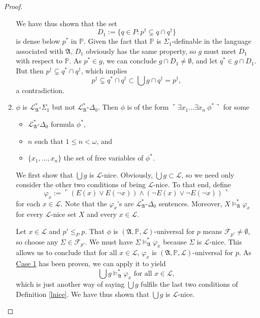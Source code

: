 \documentclass[12pt, twoside]{memoir}
\numberwithin{equation}{section}
\theoremstyle{definition}
\theoremstyle{remark}
\theoremstyle{definition}
\theoremstyle{definition}
\theoremstyle{definition}
\theoremstyle{remark}
\begin{document}
\begin{proof}
\begin{enumerate}[label=Case \arabic*:, leftmargin=50pt]
    We have thus shown that the set $$D_1 := \{q \in P : p^{\dagger} \subsetneq q \cap q^{\dagger}\}$$ is dense below $p^*$ in $\mathbb{P}$. Given the fact that $\mathbb{P}$ is $\Sigma_1$-definable in the language associated with $\mathfrak{A}$, $D_1$ obviously has the same property, so $g$ must meet $D_1$ with respect to $\mathbb{P}$. As $p^* \in g$, we can conclude $g \cap D_1 \neq \emptyset$, and let $q^* \in g \cap D_1$. But then $p^{\dagger} \subsetneq q^* \cap q^{\dagger}$, which implies $$p^{\dagger} \subsetneq q^* \cap q^{\dagger} \subset \bigcup g \cap q^{\dagger} = p^{\dagger},$$ a contradiction. 
    
    \item $\phi$ is $\mathcal{L}^{*}_{\mathfrak{A}}$-$\Sigma_1$ but not $\mathcal{L}^{*}_{\mathfrak{A}}$-$\Delta_0$. Then $\phi$ is of the form $\ulcorner \exists x_1 \dots \exists x_n \ \phi^* \urcorner$ for some 
    \begin{itemize}
        \item $\mathcal{L}^{*}_{\mathfrak{A}}$-$\Delta_0$ formula $\phi^*$,
        \item $n$ such that $1 \leq n < \omega$, and
        \item $\{x_1, \dots, x_n\}$ the set of free variables of $\phi^*$.
    \end{itemize} 
    
    We first show that $\bigcup g$ is $\mathcal{L}$-nice. Obviously, $\bigcup g \subset \mathcal{L}$, so we need only consider the other two conditions of being $\mathcal{L}$-nice. To that end, define $$\varphi_x := \ulcorner (E(x) \vee E(\neg x)) \wedge (\neg E(x) \vee \neg E(\neg x)) \urcorner$$ for each $x \in \mathcal{L}$. Note that the $\varphi_x$'s are $\mathcal{L}^{*}_{\mathfrak{A}}$-$\Delta_0$ sentences. Moreover, $X \models^{*}_{\mathfrak{A}} \varphi_x$ for every $\mathcal{L}$-nice set $X$ and every $x \in \mathcal{L}$. 
    
    Let $x \in \mathcal{L}$ and $p' \leq_{P} p$. That $\phi$ is $(\mathfrak{A}, \mathbb{P}, \mathcal{L})$-universal for $p$ means $\mathcal{F}_{p'} \neq \emptyset$, so choose any $\Sigma \in \mathcal{F}_{p'}$. We must have $\Sigma \models^{*}_{\mathfrak{A}} \varphi_x$ because $\Sigma$ is $\mathcal{L}$-nice. This allows us to conclude that for all $x \in \mathcal{L}$, $\varphi_x$ is $(\mathfrak{A}, \mathbb{P}, \mathcal{L})$-universal for $p$. As \hyperref[526c1]{Case 1} has been proven, we can apply it to yield $$\bigcup g \models^{*}_{\mathfrak{A}} \varphi_x \text{ for all } x \in \mathcal{L},$$ which is just another way of saying $\bigcup g$ fulfils the last two conditions of Definition \ref{lnice}. We have thus shown that $\bigcup g$ is $\mathcal{L}$-nice. 
    

\end{enumerate}
\end{proof}
\end{document}
